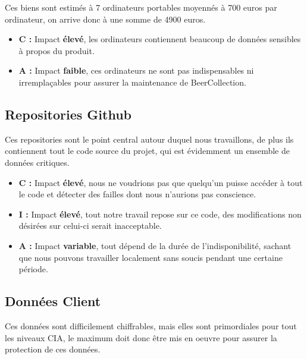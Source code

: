 \documentclass{report}
\begin{document}
			Ces biens sont estimés à 7 ordinateurs portables moyennés à 700 euros par ordinateur, on arrive donc à une somme de 4900 euros.\\

			\begin{itemize}
				\item \textbf{C :} Impact \textbf{élevé}, les ordinateurs contiennent beaucoup de données sensibles à propos du produit.\\
				\item \textbf{A :} Impact \textbf{faible}, ces ordinateurs ne sont pas indispensables ni irremplaçables pour assurer la maintenance de BeerCollection.\\
			\end{itemize}
			

		\subsection{Repositories Github}

			Ces repositories sont le point central autour duquel nous travaillons, de plus ils contiennent tout le code source du projet, qui est évidemment un ensemble de données critiques.\\

			\begin{itemize}
				\item \textbf{C :} Impact \textbf{élevé}, nous ne voudrions pas que quelqu'un puisse accéder à tout le code et détecter des failles dont nous n'aurions pas conscience.\\
				\item \textbf{I :} Impact \textbf{élevé}, tout notre travail repose sur ce code, des modifications non désirées sur celui-ci serait inacceptable.\\
				\item \textbf{A :} Impact \textbf{variable}, tout dépend de la durée de l'indisponibilité, sachant que nous pouvons travailler localement sans soucis pendant une certaine période.\\
			\end{itemize}

		\subsection{Données Client}

			Ces données sont difficilement chiffrables, mais elles sont primordiales pour tout les niveaux CIA, le maximum doit donc être mis en oeuvre pour assurer la protection de ces données.\\
\end{document}
